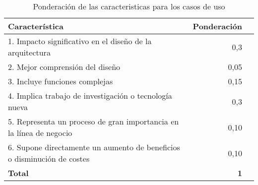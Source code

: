 \begin{table}[H]
\begin{center}
\begin{tabular}{p{11cm} r p{}}
\textbf{Característica} & \textbf{Ponderación} \\ \hline \hline
1. Impacto significativo en el diseño de la arquitectura & 0,3 \\ \hline
2. Mejor comprensión del diseño & 0,05 \\ \hline
3. Incluye funciones complejas & 0,15 \\ \hline
4. Implica trabajo de investigación o tecnología nueva &  0,3 \\ \hline
5. Representa un proceso de gran importancia en la línea de negocio & 0,10 \\ \hline
6. Supone directamente un aumento de beneficios o disminución de costes & 0,10 \\ \hline \hline
\textbf{Total} & \textbf{1} \\
\end{tabular}
\caption{Ponderación de las caracteristicas para los casos de uso}
\label{tab:priorizacion}
\end{center}
\end{table}

\newpage
